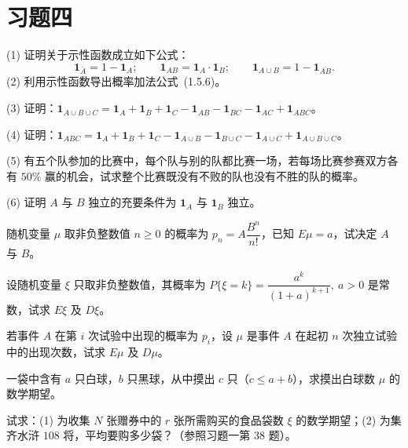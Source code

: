 \documentclass[../../main.tex]{subfiles}
\begin{document}
\section*{习题四}\label{section:ch04-习题}

\begin{exercise}\label{exercise:ch04-01}
(1) 证明关于示性函数成立如下公式：
\[
\mathbf{1}_{\bar{A}}=1-\mathbf{1}_A;\qquad
\mathbf{1}_{AB}=\mathbf{1}_A\cdot\mathbf{1}_B;\qquad
\mathbf{1}_{A\cup B}=1-\mathbf{1}_{\overline{AB}}.
\]
(2) 利用示性函数导出概率加法公式~(1.5.6)。

(3) 证明：$\mathbf{1}_{A\cup B\cup C}=\mathbf{1}_A+\mathbf{1}_B+\mathbf{1}_C-\mathbf{1}_{AB}-\mathbf{1}_{BC}-\mathbf{1}_{AC}+\mathbf{1}_{ABC}$。

(4) 证明：$\mathbf{1}_{ABC}=\mathbf{1}_A+\mathbf{1}_B+\mathbf{1}_C-\mathbf{1}_{A\cup B}-\mathbf{1}_{B\cup C}-\mathbf{1}_{A\cup C}+\mathbf{1}_{A\cup B\cup C}$。

(5) 有五个队参加的比赛中，每个队与别的队都比赛一场，若每场比赛参赛双方各有 $50\%$ 赢的机会，试求整个比赛既没有不败的队也没有不胜的队的概率。

(6) 证明 $A$ 与 $B$ 独立的充要条件为 $\mathbf{1}_A$ 与 $\mathbf{1}_B$ 独立。
\end{exercise}

\begin{exercise}\label{exercise:ch04-02}
随机变量 $\mu$ 取非负整数值 $n\geqslant 0$ 的概率为 $p_n=A\dfrac{B^n}{n!}$，已知 $E\mu=a$，试决定 $A$ 与 $B$。
\end{exercise}

\begin{exercise}\label{exercise:ch04-03}
设随机变量 $\xi$ 只取非负整数值，其概率为 $P\{\xi=k\}=\dfrac{a^k}{(1+a)^{k+1}},\ a>0$ 是常数，试求 $E\xi$ 及 $D\xi$。
\end{exercise}

\begin{exercise}\label{exercise:ch04-04}
若事件 $A$ 在第 $i$ 次试验中出现的概率为 $p_i$，设 $\mu$ 是事件 $A$ 在起初 $n$ 次独立试验中的出现次数，试求 $E\mu$ 及 $D\mu$。
\end{exercise}

\begin{exercise}\label{exercise:ch04-05}
一袋中含有 $a$ 只白球，$b$ 只黑球，从中摸出 $c$ 只（$c\leqslant a+b$），求摸出白球数 $\mu$ 的数学期望。
\end{exercise}

\begin{exercise}\label{exercise:ch04-06}
试求：(1) 为收集 $N$ 张赠券中的 $r$ 张所需购买的食品袋数 $\xi$ 的数学期望；(2) 为集齐水浒 $108$ 将，平均要购多少袋？（参照习题一第 $38$ 题）。
\end{exercise}
\end{document}
